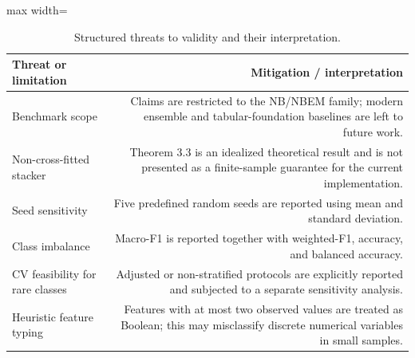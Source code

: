 \begin{table}[!htbp]
\centering
\scriptsize
\caption{Structured threats to validity and their interpretation.}
\label{tab:threats}
\begin{adjustbox}{max width=\textwidth}
\begin{tabular}{lr}
\toprule
Threat or limitation & Mitigation / interpretation \\
\midrule
Benchmark scope & Claims are restricted to the NB/NBEM family; modern ensemble and tabular-foundation baselines are left to future work. \\
Non-cross-fitted stacker & Theorem 3.3 is an idealized theoretical result and is not presented as a finite-sample guarantee for the current implementation. \\
Seed sensitivity & Five predefined random seeds are reported using mean and standard deviation. \\
Class imbalance & Macro-F1 is reported together with weighted-F1, accuracy, and balanced accuracy. \\
CV feasibility for rare classes & Adjusted or non-stratified protocols are explicitly reported and subjected to a separate sensitivity analysis. \\
Heuristic feature typing & Features with at most two observed values are treated as Boolean; this may misclassify discrete numerical variables in small samples. \\
\bottomrule
\end{tabular}
\end{adjustbox}
\end{table}
